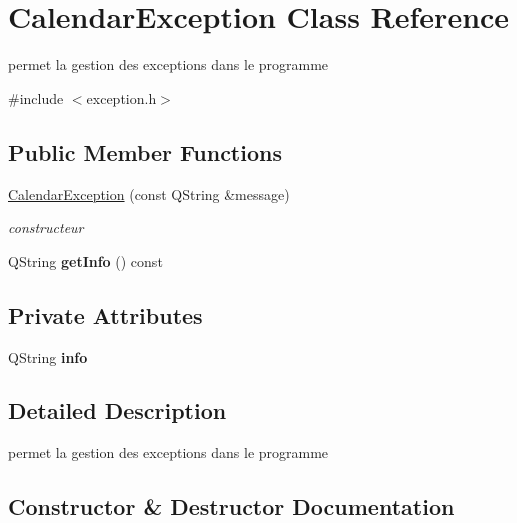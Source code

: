 \hypertarget{class_calendar_exception}{}\section{Calendar\+Exception Class Reference}
\label{class_calendar_exception}


permet la gestion des exceptions dans le programme  




{\ttfamily \#include $<$exception.\+h$>$}

\subsection*{Public Member Functions}
\begin{DoxyCompactItemize}
\item 
\hyperlink{class_calendar_exception_afd73d3ab38bc56bb09dfd7674f71d0c3}{Calendar\+Exception} (const Q\+String \&message)
\begin{DoxyCompactList}\small\item\em constructeur \end{DoxyCompactList}\item 
\hypertarget{class_calendar_exception_a5a7ad3b9a770fbc361c809dde840d44c}{}Q\+String {\bfseries get\+Info} () const \label{class_calendar_exception_a5a7ad3b9a770fbc361c809dde840d44c}

\end{DoxyCompactItemize}
\subsection*{Private Attributes}
\begin{DoxyCompactItemize}
\item 
\hypertarget{class_calendar_exception_a0dd66a29c8e82f9cf94da8305576773f}{}Q\+String {\bfseries info}\label{class_calendar_exception_a0dd66a29c8e82f9cf94da8305576773f}

\end{DoxyCompactItemize}


\subsection{Detailed Description}
permet la gestion des exceptions dans le programme 

\subsection{Constructor \& Destructor Documentation}
\hypertarget{class_calendar_exception_afd73d3ab38bc56bb09dfd7674f71d0c3}{}
